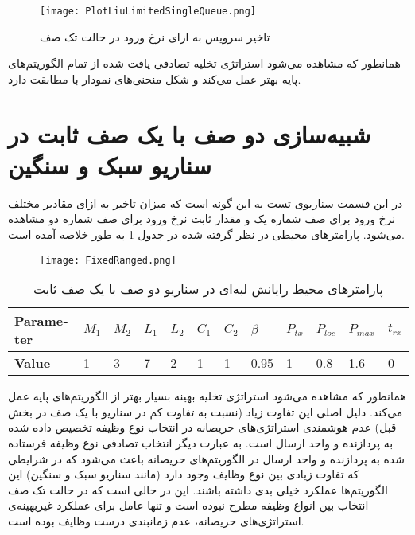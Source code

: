 \begin{figure}[H]
	\centering
	\texttt{[image: PlotLiuLimitedSingleQueue.png]}
	\caption{تاخیر سرویس به ازای نرخ ورود در حالت تک صف}
	\label{plot:singleQueue}
\end{figure}
همانطور که مشاهده می‌شود استراتژی تخلیه تصادفی یافت شده از تمام الگوریتم‌های پایه بهتر عمل می‌کند و شکل منحنی‌های نمودار با \cite{Liu} مطابقت دارد.
\newpage
\section{شبیه‌سازی دو صف با یک صف ثابت در سناریو سبک و سنگین}
در این قسمت سناریوی تست به این گونه است که میزان تاخیر به ازای مقادیر مختلف نرخ ورود برای صف شماره یک و مقدار ثابت نرخ ورود برای صف شماره دو مشاهده می‌شود. پارامترهای محیطی در نظر گرفته شده در جدول \ref{table:fixedranged} به طور خلاصه آمده است.
\begin{figure}[H]
	\texttt{[image: FixedRanged.png]}
\end{figure}
\begin{table}[H]
	\centering
	\begin{latin}
		\begin{tabular}{@{}llllllllllll@{}}
			\toprule
			\textbf{Parameter} & $M_1$ & $M_2$ & $L_1$ & $L_2$ & $C_1$ & $C_2$ & $\beta$ & $P_{tx}$ & $P_{loc}$ & $P_{max}$ & $t_{rx}$ \\ \midrule
			\textbf{Value}     & 1     & 3     & 7     & 2     & 1     & 1     & 0.95    & 1        & 0.8       & 1.6       & 0        \\ \bottomrule
		\end{tabular}
	\end{latin}
	\caption{پارامترهای محیط رایانش لبه‌ای در سناریو دو صف با یک صف ثابت}
	\label{table:fixedranged}
\end{table}
همانطور که مشاهده می‌شود استراتژی تخلیه بهینه بسیار بهتر از الگوریتم‌های پایه عمل می‌کند. دلیل اصلی این تفاوت زیاد (نسبت به تفاوت کم در سناریو با یک صف در بخش قبل) عدم هوشمندی استراتژی‌های حریصانه در انتخاب نوع وظیفه تخصیص داده شده به پردازنده و واحد ارسال است. به عبارت دیگر انتخاب تصادفی نوع وظیفه فرستاده شده به پردازنده و واحد ارسال در الگوریتم‌های حریصانه باعث می‌شود که در شرایطی که تفاوت زیادی بین نوع وظایف وجود دارد (مانند سناریو سبک و سنگین) این الگوریتم‌ها عملکرد خیلی بدی داشته باشند. این در حالی است که در حالت تک صف انتخاب بین انواع وظیفه مطرح نبوده است و تنها عامل برای عملکرد غیربهینه‌ی استراتژی‌های حریصانه، عدم زمانبندی درست وظایف بوده است.
\newpage
